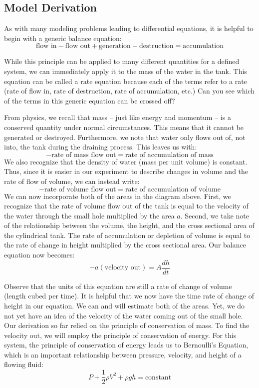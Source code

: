 \documentclass{ximera}
\begin{document}
\subsection*{Model Derivation}
 
As with many modeling problems leading to differential equations, it is helpful to begin with a generic balance equation:
$$\mbox{flow in}-\mbox{flow out}+\mbox{generation}-\mbox{destruction}=\mbox{accumulation}$$
 
While this principle can be applied to many different quantities for a defined system, we can immediately apply it to the mass of the water in the tank.  This equation can be called a rate equation because each of the terms refer to a rate (rate of flow in, rate of destruction, rate of accumulation, etc.)  Can you see which of the terms in this generic equation can be crossed off? 
 
From physics, we recall that mass – just like energy and momentum – is a conserved quantity under normal circumstances.  This means that it cannot be generated or destroyed.  Furthermore, we note that water only flows out of, not into, the tank during the draining process.  This leaves us with:
$$-\mbox{rate of mass flow out}=\mbox{rate of accumulation of mass}$$
We also recognize that the density of water (mass per unit volume) is constant.  Thus, since it is easier in our experiment to describe changes in volume and the rate of flow of volume, we can instead write:
$$-\mbox{rate of volume flow out}=\mbox{rate of accumulation of volume}$$
We can now incorporate both of the areas in the diagram above.  First, we recognize that the rate of volume flow out of the tank is equal to the velocity of the water through the small hole multiplied by the area $a$.  Second, we take note of the relationship between the volume, the height, and the cross sectional area of the cylindrical tank.  The rate of accumulation or depletion of volume is equal to the rate of change in height multiplied by the cross sectional area.  Our balance equation now becomes:
$$-a(\mbox{velocity out})=A\frac{dh}{dt}$$
 
Observe that the units of this equation are still a rate of change of volume (length cubed per time).  It is helpful that we now have the time rate of change of height in our equation.  We can and will estimate both of the areas.  Yet, we do not yet have an idea of the velocity of the water coming out of the small hole.  Our derivation so far relied on the principle of conservation of mass.  To find the velocity out, we will employ the principle of conservation of energy.
For this system, the principle of conservation of energy leads us to Bernoulli’s Equation, which is an important relationship between pressure, velocity, and height of a flowing fluid:
$$P+\frac{1}{2}\rho V^2+\rho gh=\mbox{constant}$$
 
\end{document}
